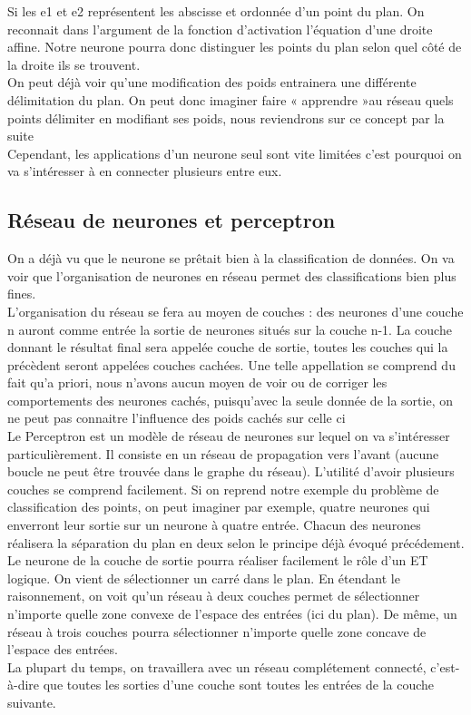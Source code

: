 Si les e1 et e2 représentent les abscisse et ordonnée d’un point du plan. On reconnait dans l’argument de la fonction d’activation l’équation d’une droite affine. Notre neurone pourra donc distinguer les points du plan selon quel côté de la droite ils se trouvent.\\

On peut déjà voir qu’une modification des poids entrainera une différente délimitation du plan. On peut donc imaginer faire « apprendre »au réseau quels points délimiter en modifiant ses poids, nous reviendrons sur ce concept par la suite\\
Cependant, les applications d’un neurone seul sont vite limitées c’est pourquoi on va s’intéresser à en connecter plusieurs entre eux.\\

\subsection{Réseau de neurones et perceptron} %
\label{sub:reseau_de_neurones}
On a déjà vu que le neurone se prêtait bien à la classification de données. On va voir que l’organisation de neurones en réseau permet des classifications bien plus fines.\\
L’organisation du réseau se fera au moyen de couches : des neurones d’une couche n auront comme entrée la sortie de neurones situés sur la couche n-1. La couche donnant le résultat final sera appelée couche de sortie, toutes les couches qui la précèdent seront appelées couches cachées. Une telle appellation se comprend du fait qu’a priori, nous n’avons aucun moyen de voir ou de corriger les comportements des neurones cachés, puisqu’avec la seule donnée de la sortie, on ne peut pas connaitre l’influence des poids cachés sur celle ci\\

Le Perceptron est un modèle de réseau de neurones sur lequel on va s’intéresser particulièrement. Il consiste en un réseau de propagation vers l’avant (aucune boucle ne peut être trouvée dans le graphe du réseau).
L’utilité d’avoir plusieurs couches se comprend facilement. Si on reprend notre exemple du problème de classification des points, on peut imaginer par exemple, quatre neurones qui enverront leur sortie sur un neurone à quatre entrée. Chacun des neurones réalisera la séparation du plan en deux selon le principe déjà évoqué précédement. Le neurone de la couche de sortie pourra réaliser facilement le rôle d’un ET logique. On vient de sélectionner un carré dans le plan. En étendant le raisonnement, on voit qu’un réseau à deux couches permet de sélectionner n’importe quelle zone convexe de l’espace des entrées (ici du plan). De même, un réseau à trois couches pourra sélectionner n’importe quelle zone concave de l’espace des entrées.\\
La plupart du temps, on travaillera avec un réseau complétement connecté, c’est-à-dire que toutes les sorties d’une couche sont toutes les entrées de la couche suivante.

